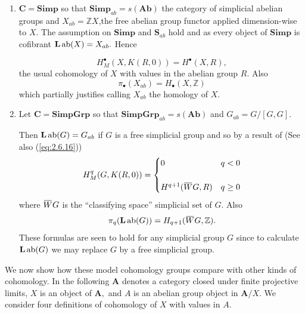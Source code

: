 \documentclass[../main]{subfiles}
\begin{document}
\begin{examples} 
   \begin{enumerate} 
     \item $\mathbf{C} = \mathbf{Simp} $ so that $\mathbf{Simp}_{ab} = s(\mathbf{Ab})$ the category of simplicial abelian groups and $X_{ab} = \mathbb{Z}X$,the free abelian group functor applied dimension-wise to $X$. The assumption on $\mathbf{Simp}$ and $\mathbf S_{ab}$ hold and as every object of $\mathbf{Simp}$ is cofibrant $\mathbf L \operatorname{ab} (X) = X_{ab}.$ Hence 

       \[ 
          H_{M}^{\bullet} (X,K(R,0)) = H^\bullet (X,R),
       \] 
the usual cohomology of $X$ with values in the abelian group $R$. Also 
       \[ 
         \pi_{\bullet}(X_{ab}) = H_{\bullet}(X, \mathbb{Z})
       \] 
       which partially justifies calling $X_{ab}$ the homology of $X$.
       

     \item Let $\mathbf{C} = \mathbf{SimpGrp} $ so that $\mathbf{SimpGrp}_{ab} = s(\mathbf{Ab})$ and $G_{ab} = G / [G,G].$ 

       Then $\mathbf L \operatorname{ab}(G) = G_{ab}$ if $G$ is a free simplicial group and so by a result of \cite{kan_hurewicz_1958} (See also (\ref{eq:2.6.16})) 
             \[ 
               H_{M}^{q} (G,K(R,0)) = 
               \begin{cases} 
                 0 & q <0 \\
                  & \\
                 H^{q+1}(\xoverline WG,R) & q \ge 0
               \end{cases}
             \] 
             where $\xoverline WG$ is the ``classifying space'' simplicial set of $G$. Also
             \[ 
               \pi_{q}(\mathbf{L}\ab (G)) = H_{q+1}(\xoverline WG, \mathbb{Z}).
             \] 
             These formulas are seen to hold for any simplicial group $G$ since to calculate $\mathbf{L} \operatorname{ab}(G)$ we may replace $G$ by a free simplicial group.
   \end{enumerate} 
\end{examples}


We now show how these model cohomology groups compare with other kinds of cohomology. In the following $\mathbf A$ denotes a category closed under finite projective limits, $X$ is an object of $\mathbf A,$ and $A$ is an abelian group object in $\mathbf A/X.$ We consider four definitions of cohomology of $X$ with values in $A.$ 
\end{document}

